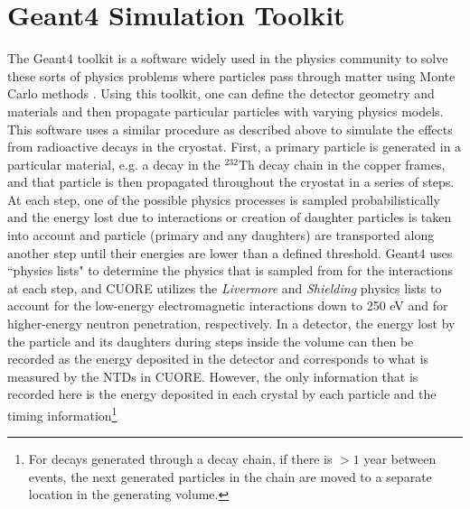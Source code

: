 \section{Geant4 Simulation Toolkit}
The Geant4 toolkit is a software widely used in the physics community to solve these sorts of physics problems where particles pass through matter using Monte Carlo methods \cite{AGOSTINELLI2003250, 528223, ALLISON2016186}.
Using this toolkit, one can define the detector geometry and materials and then propagate particular particles with varying physics models.
This software uses a similar procedure as described above to simulate the effects from radioactive decays in the cryostat.
First, a primary particle is generated in a particular material, e.g. a decay in the $^{232}$Th decay chain in the copper frames, and that particle is then propagated throughout the cryostat in a series of steps.
At each step, one of the possible physics processes is sampled probabilistically and the energy lost due to interactions or creation of daughter particles is taken into account and particle (primary and any daughters) are transported along another step until their energies are lower than a defined threshold.
Geant4 uses ``physics lists" to determine the physics that is sampled from for the interactions at each step, and CUORE utilizes the \textit{Livermore} and \textit{Shielding} physics lists to account for the low-energy electromagnetic interactions down to 250 eV and for higher-energy neutron penetration, respectively.
In a detector, the energy lost by the particle and its daughters during steps inside the volume can then be recorded as the energy deposited in the detector and corresponds to what is measured by the NTDs in CUORE.
However, the only information that is recorded here is the energy deposited in each crystal by each particle and the timing information\footnote{For decays generated through a decay chain, if there is $>1$ year between events, the next generated particles in the chain are moved to a separate location in the generating volume.}

